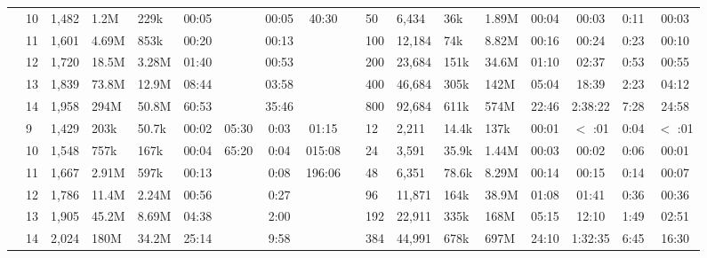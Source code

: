 \begin{table*}
\begin{tabular}{m{.1cm}C{.35cm}C{.5cm}C{.7cm}C{.6cm}cccc | m{.1cm}C{.5cm}C{.75cm}C{.6cm}C{.65cm}cccc}
 & 10 & 1,482 & 1.2M & 229k & 00:05 & \timeout{} & 00:05 & 40:30 &
 & 50  & 6,434  & 36k  & 1.89M  & 00:04 &00:03 &  0:11 & 00:03 \\

 & 11 & 1,601 & 4.69M & 853k & 00:20 & \timeout{} & 00:13 & \timeout{} &
 & 100 & 12,184 & 74k  & 8.82M  & 00:16 & 00:24 & 0:23 & 00:10 \\

 & 12 & 1,720 & 18.5M & 3.28M & 01:40 & \timeout{} & 00:53 & \timeout{} &
 & 200 & 23,684 & 151k & 34.6M & 01:10 & 02:37 & 0:53 & 00:55 \\

 & 13 & 1,839 & 73.8M & 12.9M & 08:44 & \timeout{} & 03:58 & \timeout{} &
 & 400 & 46,684 & 305k & 142M & 05:04 & 18:39 & 2:23 & 04:12 \\

 & 14 & 1,958 & 294M & 50.8M & 60:53 & \timeout{} & 35:46 & \timeout{} &
 & 800 & 92,684 & 611k  & 574M & 22:46 & 2:38:22 & 7:28 & 24:58 \\
 \midrule 

 \parbox[t]{2mm}{}
 & 9 & 1,429 & 203k & 50.7k & 00:02 & 05:30 & 0:03 & 01:15
&
 \parbox[t]{2mm}{}
 & 12  & 2,211  & 14.4k  & 137k &  00:01 & $<$ \!\!\!\! :01  & 0:04 & $<$ \!\!\!\! :01 
\\
 & 10 & 1,548 & 757k & 167k & 00:04 & 65:20 & 0:04 & 015:08  &
 & 24  & 3,591  & 35.9k  & 1.44M   &  00:03 & 00:02 & 0:06 & 00:01 
 \\
 & 11 & 1,667 & 2.91M  & 597k & 00:13 & \timeout{} &  0:08 & 196:06 &
 & 48  & 6,351  & 78.6k  & 8.29M   &  00:14 & 00:15 & 0:14 &  00:07
\\
 & 12 & 1,786 & 11.4M & 2.24M & 00:56 &  \timeout{}& 0:27 & \timeout{} &
  & 96  & 11,871 & 164k & 38.9M  &  01:08 & 01:41 & 0:36 & 00:36 
\\ 
 & 13 & 1,905 & 45.2M & 8.69M & 04:38 &  \timeout{}& 2:00 & \timeout{} &
 & 192 & 22,911 & 335k & 168M &  05:15 & 12:10 & 1:49 & 02:51 
\\
 & 14 & 2,024 & 180M & 34.2M & 25:14 & \timeout{}& 9:58 & \timeout{} &
 & 384 & 44,991 & 678k & 697M & 24:10 & 1:32:35 & 6:45 & 16:30 
 \\
 \bottomrule
 \end{tabular}
 \end{table*}
